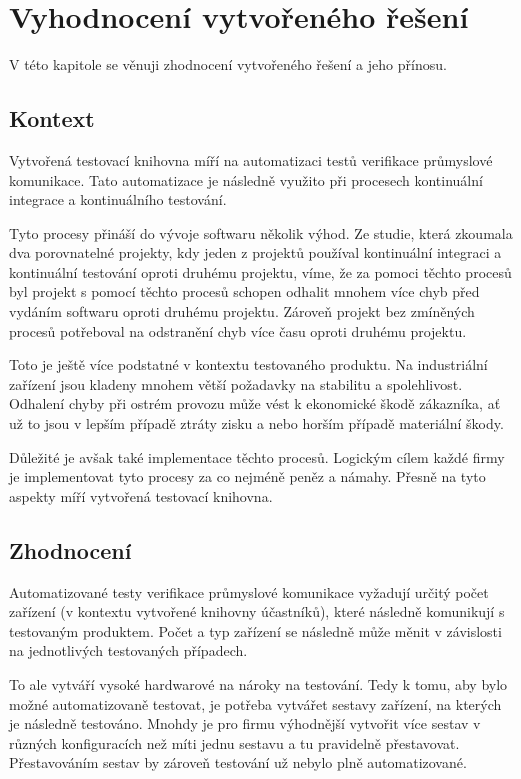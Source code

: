 \chapter{Vyhodnocení vytvořeného řešení}\label{chap:evaluation}

V této kapitole se věnuji zhodnocení vytvořeného řešení a jeho přínosu. \\


\section{Kontext}
Vytvořená testovací knihovna míří na automatizaci testů verifikace průmyslové komunikace. Tato automatizace je následně využito při procesech kontinuální integrace a kontinuálního testování. 

Tyto procesy přináší do vývoje softwaru několik výhod. Ze studie, která zkoumala dva porovnatelné projekty, kdy jeden z projektů používal kontinuální integraci a kontinuální testování oproti druhému projektu, víme, že za pomoci těchto procesů byl projekt s pomocí těchto procesů schopen odhalit mnohem více chyb před vydáním softwaru oproti druhému projektu. Zároveň projekt bez zmíněných procesů potřeboval na odstranění chyb více času oproti druhému projektu. \cite{ci_study}

Toto je ještě více podstatné v kontextu testovaného produktu. Na industriální zařízení jsou kladeny mnohem větší požadavky na stabilitu a spolehlivost. Odhalení chyby při ostrém provozu může vést k ekonomické škodě zákazníka, ať už to jsou v lepším případě ztráty zisku a nebo horším případě materiální škody.

Důležité je avšak také implementace těchto procesů. Logickým cílem každé firmy je implementovat tyto procesy za co nejméně peněz a námahy. Přesně na tyto aspekty míří vytvořená testovací knihovna. 


\section{Zhodnocení}

Automatizované testy verifikace průmyslové komunikace vyžadují určitý počet zařízení (v kontextu vytvořené knihovny účastníků), které následně komunikují s testovaným produktem. Počet a typ zařízení se následně může měnit v závislosti na jednotlivých testovaných případech.  

To ale vytváří vysoké hardwarové na nároky na testování. Tedy k tomu, aby bylo možné automatizovaně testovat, je potřeba vytvářet sestavy zařízení, na kterých je následně testováno. Mnohdy je pro firmu výhodnější vytvořit více sestav v různých konfiguracích než míti jednu sestavu a tu pravidelně přestavovat. Přestavováním sestav by zároveň testování už nebylo plně automatizované. 

